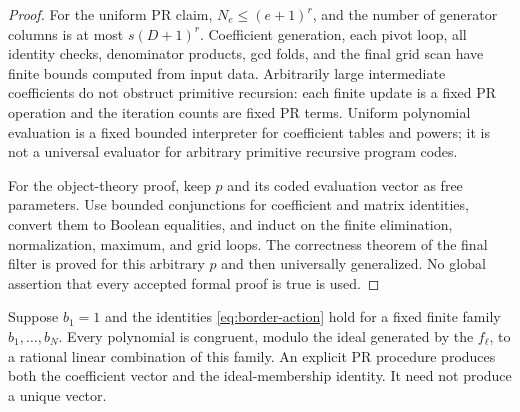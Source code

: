 \begin{proof}
For the uniform PR claim, $N_e\le(e+1)^r$, and the number of generator
columns is at most $s(D+1)^r$. Coefficient generation, each pivot loop,
all identity checks, denominator products, gcd folds, and the final grid
scan have finite bounds computed from input data. Arbitrarily large
intermediate coefficients do not obstruct primitive recursion: each
finite update is a fixed PR operation and the iteration counts are fixed
PR terms. Uniform polynomial evaluation is a fixed bounded interpreter
for coefficient tables and powers; it is not a universal evaluator for
arbitrary primitive recursive program codes.

For the object-theory proof, keep $p$ and its coded evaluation vector as
free parameters. Use bounded conjunctions for coefficient and matrix
identities, convert them to Boolean equalities, and induct on the finite
elimination, normalization, maximum, and grid loops. The correctness
theorem of the final filter is proved for this arbitrary $p$ and then
universally generalized. No global assertion that every accepted formal
proof is true is used.
\end{proof}

\begin{lemma}
\label{lem:action-finite-span}
Suppose $b_1=1$ and the identities \eqref{eq:border-action} hold for a
fixed finite family $b_1,\ldots,b_N$. Every polynomial is congruent,
modulo the ideal generated by the $f_\ell$, to a rational linear
combination of this family. An explicit PR procedure produces both the
coefficient vector and the ideal-membership identity. It need not
produce a unique vector.
\end{lemma}


